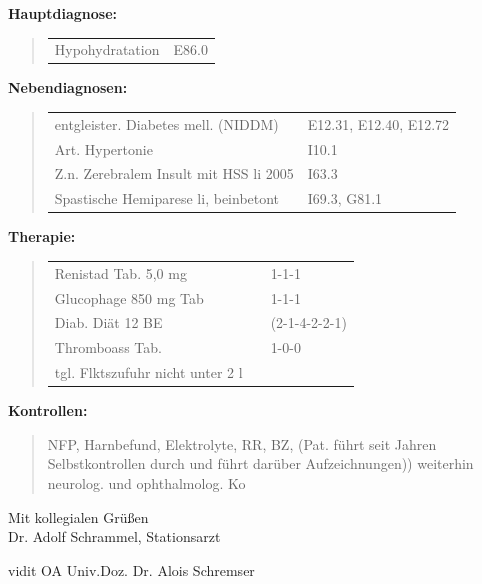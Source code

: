 {\MarginNo{\Z{}}
{\bfseries Hauptdiagnose:}

\begin{quote}
\begin{tabular}{ll}
Hypohydratation & E86.0
\\
\end{tabular}
\end{quote}

{\bfseries Nebendiagnosen:}

\begin{quote}
\begin{tabular}{ll}
entgleister. Diabetes mell. (NIDDM) & E12.31, E12.40, E12.72 
\\
Art. Hypertonie & I10.1
\\
Z.n. Zerebralem Insult mit HSS li 2005& I63.3
\\
Spastische Hemiparese li, beinbetont&I69.3, G81.1
\\
\end{tabular}
\end{quote}



{\bfseries Therapie:}

\begin{quote}
\begin{tabular}{lll}
Renistad Tab. 5,0 mg && 1-1-1 
\\
Glucophage 850 mg Tab && 1-1-1 
\\
Diab. Diät 12 BE&&(2-1-4-2-2-1) 
\\
Thromboass Tab.&&1-0-0 
\\
tgl. Flktszufuhr nicht unter 2 l&&
\end{tabular}
\end{quote}




{\bfseries Kontrollen:}

\begin{quote}
 NFP, Harnbefund, Elektrolyte, RR, BZ, (Pat. führt seit
Jahren Selbstkontrollen durch und führt darüber Aufzeichnungen)) weiterhin neurolog. und
ophthalmolog. Ko
\end{quote}









Mit kollegialen Grüßen\vspace{2em}\\ Dr. Adolf Schrammel, Stationsarzt


vidit OA Univ.Doz. Dr. Alois Schremser
}

